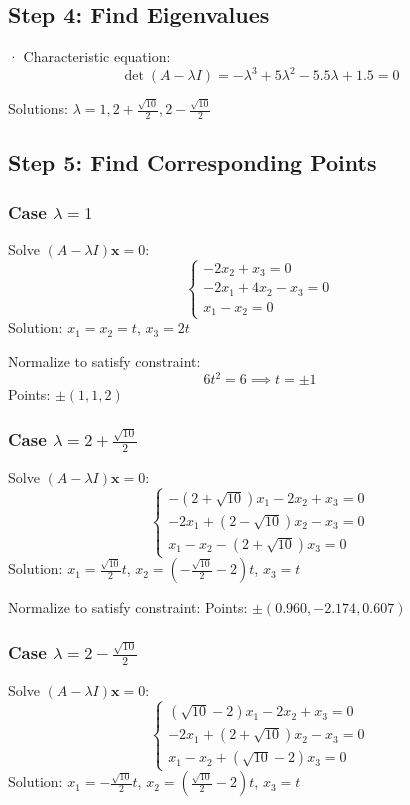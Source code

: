\documentclass{article}
\begin{document}
\subsection*{Step 4: Find Eigenvalues}  ·
Characteristic equation:
\[ \det(A - \lambda I) = -\lambda^{3} + 5\lambda^{2} - 5.5\lambda + 1.5 = 0 \]

Solutions: $\lambda = 1, 2+\frac{\sqrt{10}}{2}, 2-\frac{\sqrt{10}}{2}$

\subsection*{Step 5: Find Corresponding Points}
\subsubsection*{Case $\lambda = 1$}
Solve $(A - \lambda I)\mathbf{x} = 0$:
\[ \begin{cases}
        -2x_2 + x_3 = 0        \\
        -2x_1 + 4x_2 - x_3 = 0 \\
        x_1 - x_2 = 0
    \end{cases} \]
Solution: $x_1 = x_2 = t$, $x_3 = 2t$

Normalize to satisfy constraint:
\[ 6t^2 = 6 \implies t = \pm 1 \]
Points: $\pm(1, 1, 2)$

\subsubsection*{Case $\lambda = 2+\frac{\sqrt{10}}{2}$}
Solve $(A - \lambda I)\mathbf{x} = 0$:
\[ \begin{cases}
        -(2+\sqrt{10})x_1 - 2x_2 + x_3 = 0 \\
        -2x_1 +(2-\sqrt{10})x_2 - x_3 = 0  \\
        x_1 - x_2 - (2+\sqrt{10})x_3 = 0
    \end{cases} \]
Solution: $x_1 = \frac{\sqrt{10}}{2}t$, $x_2 = (-\frac{\sqrt{10}}{2}-2)t$, $x_3 = t$

Normalize to satisfy constraint:
Points: $\pm(0.960, -2.174, 0.607)$

\subsubsection*{Case $\lambda = 2-\frac{\sqrt{10}}{2}$}
Solve $(A - \lambda I)\mathbf{x} = 0$:
\[ \begin{cases}
        (\sqrt{10}-2)x_1 - 2x_2 + x_3 = 0 \\
        -2x_1 +(2+\sqrt{10})x_2 - x_3 = 0 \\
        x_1 - x_2 +(\sqrt{10}-2)x_3 = 0
    \end{cases} \]
Solution: $x_1 = -\frac{\sqrt{10}}{2}t$, $x_2 = (\frac{\sqrt{10}}{2}-2)t$, $x_3 = t$
\end{document}
